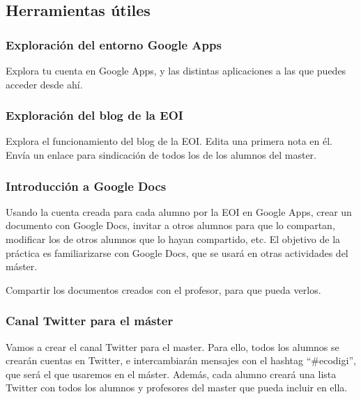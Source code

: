 \documentclass[a4paper,12pt]{article}
\begin{document}
\subsection{Herramientas útiles}

\subsubsection{Exploración del entorno Google Apps}
\label{sub:googleapps}

Explora tu cuenta en Google Apps, y las distintas aplicaciones a las que puedes acceder desde ahí.

\subsubsection{Exploración del blog de la EOI}
\label{sub:blog}

Explora el funcionamiento del blog de la EOI. Edita una primera nota en él. Envía un enlace para sindicación de todos los de los alumnos del master.

\subsubsection{Introducción a Google Docs}
\label{sub:googledocs}

Usando la cuenta creada para cada alumno por la EOI en Google Apps, crear un documento con Google Docs, invitar a otros alumnos para que lo compartan, modificar los de otros alumnos que lo hayan compartido, etc. El objetivo de la práctica es familiarizarse con Google Docs, que se usará en otras actividades del máster.

Compartir los documentos creados con el profesor, para que pueda verlos.

\subsubsection{Canal Twitter para el máster}
\label{sub:canaltwitter}

Vamos a crear el canal Twitter para el master. Para ello, todos los alumnos se crearán cuentas en Twitter, e intercambiarán mensajes con el hashtag ``\#ecodigi'', que será el que usaremos en el máster. Además, cada alumno creará una lista Twitter con todos los alumnos y profesores del master que pueda incluir en ella.
\end{document}
